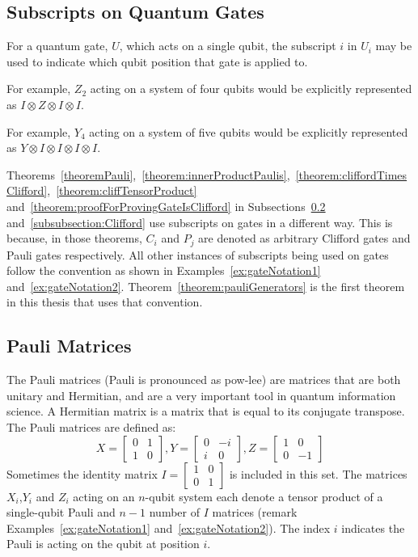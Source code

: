 \subsection{Subscripts on Quantum Gates}
For a quantum gate, $U$, which acts on a single qubit, the subscript $i$ in $U_i$ may be used to indicate which qubit position that gate is applied to. 
\begin{example}
\label{ex:gateNotation1}
For example, $Z_2$ acting on a system of four qubits would be explicitly represented as $I \otimes Z \otimes I \otimes I$.
\end{example}
\begin{example}
\label{ex:gateNotation2}
For example, $Y_4$ acting on a system of five qubits would be explicitly represented as $Y \otimes I \otimes I \otimes I \otimes I$.
\end{example}
Theorems~\ref{theoremPauli},~\ref{theorem:innerProductPaulis},~\ref{theorem:cliffordTimesClifford},~\ref{theorem:cliffTensorProduct} and~\ref{theorem:proofForProvingGateIsClifford} in Subsections~\ref{subsubsection:paulis} and~\ref{subsubsection:Clifford} use subscripts on gates in a different way. This is because, in those theorems, $C_i$ and $P_j$ are denoted as arbitrary Clifford gates and Pauli gates respectively. All other instances of subscripts being used on gates follow the convention as shown in Examples~\ref{ex:gateNotation1} and~\ref{ex:gateNotation2}. Theorem~\ref{theorem:pauliGenerators} is the first theorem in this thesis that uses that convention.

\subsection{Pauli Matrices}
\label{subsubsection:paulis}
The Pauli matrices (Pauli is pronounced as pow-lee) are matrices that are both unitary and Hermitian, and are a very important tool in quantum information science. A Hermitian matrix is a matrix that is equal to its conjugate transpose. The Pauli matrices are defined as:
$$X = \begin{bmatrix} 0 & 1 \\ 1 & 0\end{bmatrix}, Y = \begin{bmatrix} 0 & -i \\ i & 0\end{bmatrix}, Z =  \begin{bmatrix} 1 & 0 \\ 0 & -1\end{bmatrix}$$
Sometimes the identity matrix $I = \begin{bmatrix} 1 & 0 \\ 0 & 1\end{bmatrix}$ is included in this set. The matrices $X_i$,$Y_i$ and $Z_i$ acting on an $n$-qubit system each denote a tensor product of a single-qubit Pauli and $n-1$ number of $I$ matrices (remark Examples~\ref{ex:gateNotation1} and~\ref{ex:gateNotation2}). The index $i$ indicates the Pauli is acting on the qubit at position $i$.

